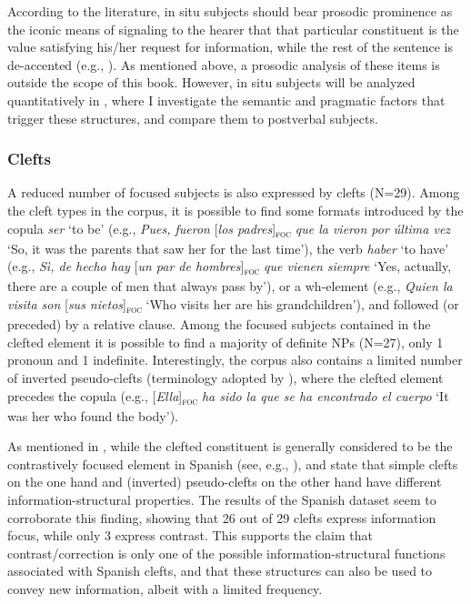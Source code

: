 {According to the literature, in situ subjects should bear prosodic prominence as the iconic means of signaling to the hearer that that particular constituent is the value satisfying his/her request for information, while the rest of the sentence is de-accented (e.g., \cite{fery2001focus}). As mentioned above, a prosodic analysis of these items is outside the scope of this book. However, in situ subjects will be analyzed quantitatively in , where I investigate the semantic and pragmatic factors that trigger these structures, and compare them to postverbal subjects.

\subsubsection{Clefts} \label{sub:4.5.1.5}

A reduced number of focused subjects is also expressed by clefts (N=29). Among the cleft types in the corpus, it is possible to find some formats introduced by the copula \textit{ser} `to be' (e.g., \textit{Pues, fueron} [\textit{los padres}]\textsubscript{\textsc{foc}} \normalsize \textit{que la vieron por última vez} `So, it was the parents that saw her for the last time'), the verb \textit{haber} `to have' (e.g., \textit{Sì, de hecho hay} [\textit{un par de hombres}]\textsubscript{\textsc{foc}} \normalsize \textit{que vienen siempre} `Yes, actually, there are a couple of men that always pass by'), or a wh-element (e.g., \textit{Quien la visita son} [\textit{sus nietos}]\textsubscript{\textsc{foc}} \normalsize `Who visits her are his grandchildren'), and followed (or preceded) by a relative clause.
Among the focused subjects contained in the clefted element it is possible to find a majority of definite NPs (N=27), only 1 pronoun and 1 indefinite. Interestingly, the corpus  also contains a limited number of inverted pseudo-clefts (terminology adopted by \cite{feldhausen2015oraciones}), where the clefted element precedes the copula (e.g., [\textit{Ella}]\textsubscript{\textsc{foc}} \normalsize \textit{ha sido la que se ha encontrado el cuerpo} `It was her who found the body').

As mentioned in , while the clefted constituent is generally considered to be the contrastively focused element in Spanish (see, e.g., \cite{zubizarreta1999word, van2005exploring}), \textcite{cabrera1999funciones} and \textcite{feldhausen2015oraciones} state that simple clefts on the one hand and (inverted) pseudo-clefts on the other hand have different information-structural properties. The results of the Spanish dataset seem to corroborate this finding, showing that 26 out of 29 clefts express information focus, while only 3 express contrast. This supports the claim that contrast/correction is only one of the possible information-structural functions associated with Spanish clefts, and that these structures can also be used to convey new information, albeit with a limited frequency.
 
}
